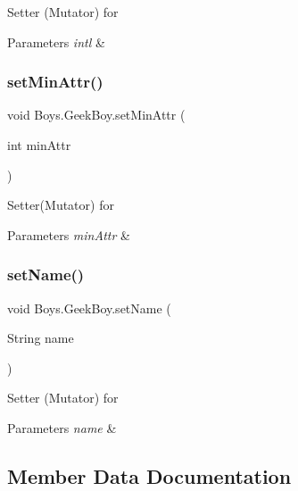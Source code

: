 Setter (Mutator) for 
\begin{DoxyParams}{Parameters}
{\em intl} & \\
\hline
\end{DoxyParams}
\mbox{\label{class_boys_1_1_geek_boy_a8868876f26dd6bf4278b470710f22d63}} 
\subsubsection{\texorpdfstring{set\+Min\+Attr()}{setMinAttr()}}
{\footnotesize\ttfamily void Boys.\+Geek\+Boy.\+set\+Min\+Attr (\begin{DoxyParamCaption}\item[{int}]{min\+Attr }\end{DoxyParamCaption})\hspace{0.3cm}{\ttfamily [inline]}}

Setter(\+Mutator) for 
\begin{DoxyParams}{Parameters}
{\em min\+Attr} & \\
\hline
\end{DoxyParams}
\mbox{\label{class_boys_1_1_geek_boy_a4ad29814d3ee6743e28b09f281f5bca2}} 
\subsubsection{\texorpdfstring{set\+Name()}{setName()}}
{\footnotesize\ttfamily void Boys.\+Geek\+Boy.\+set\+Name (\begin{DoxyParamCaption}\item[{String}]{name }\end{DoxyParamCaption})\hspace{0.3cm}{\ttfamily [inline]}}

Setter (Mutator) for 
\begin{DoxyParams}{Parameters}
{\em name} & \\
\hline
\end{DoxyParams}


\subsection{Member Data Documentation}
\mbox{\label{class_boys_1_1_geek_boy_a9cb339dc2c7e5dc53a126078d87e5ad2}} 
